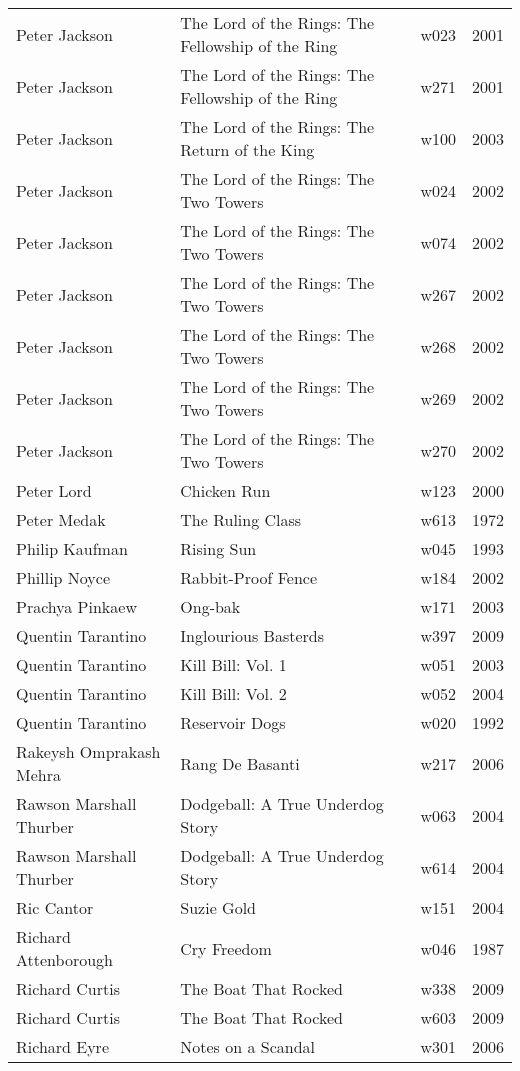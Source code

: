 \documentclass{article}
\begin{document}
\begin {center}
\begin{longtable}{l p{10cm} l l}
Peter Jackson & The Lord of the Rings: The Fellowship of the Ring & w023 & 2001 \\
Peter Jackson & The Lord of the Rings: The Fellowship of the Ring & w271 & 2001 \\
Peter Jackson & The Lord of the Rings: The Return of the King & w100 & 2003 \\
Peter Jackson & The Lord of the Rings: The Two Towers & w024 & 2002 \\
Peter Jackson & The Lord of the Rings: The Two Towers & w074 & 2002 \\
Peter Jackson & The Lord of the Rings: The Two Towers & w267 & 2002 \\
Peter Jackson & The Lord of the Rings: The Two Towers & w268 & 2002 \\
Peter Jackson & The Lord of the Rings: The Two Towers & w269 & 2002 \\
Peter Jackson & The Lord of the Rings: The Two Towers & w270 & 2002 \\
Peter Lord & Chicken Run & w123 & 2000 \\
Peter Medak & The Ruling Class & w613 & 1972 \\
Philip Kaufman & Rising Sun & w045 & 1993 \\
Phillip Noyce & Rabbit-Proof Fence & w184 & 2002 \\
Prachya Pinkaew & Ong-bak & w171 & 2003 \\
Quentin Tarantino & Inglourious Basterds & w397 & 2009 \\
Quentin Tarantino & Kill Bill: Vol. 1 & w051 & 2003 \\
Quentin Tarantino & Kill Bill: Vol. 2 & w052 & 2004 \\
Quentin Tarantino & Reservoir Dogs & w020 & 1992 \\
Rakeysh Omprakash Mehra & Rang De Basanti & w217 & 2006 \\
Rawson Marshall Thurber & Dodgeball: A True Underdog Story & w063 & 2004 \\
Rawson Marshall Thurber & Dodgeball: A True Underdog Story & w614 & 2004 \\
Ric Cantor & Suzie Gold & w151 & 2004 \\
Richard Attenborough & Cry Freedom & w046 & 1987 \\
Richard Curtis & The Boat That Rocked & w338 & 2009 \\
Richard Curtis & The Boat That Rocked & w603 & 2009 \\
Richard Eyre & Notes on a Scandal & w301 & 2006 \\

\end{longtable}
\end{center}
\end{document}
